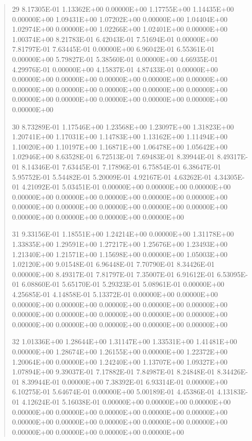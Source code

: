 \documentclass[letterpaper,10pt,english]{sphinxmanual}
\begin{document}
\begin{quote}
\begin{DUlineblock}{0em}
\item[] 29   8.17305E-01  1.13362E+00  0.00000E+00  1.17755E+00  1.14435E+00  0.00000E+00  1.09431E+00  1.07202E+00  0.00000E+00  1.04404E+00  1.02974E+00  0.00000E+00  1.02266E+00  1.02401E+00  0.00000E+00  1.00374E+00  8.21783E-01  6.42043E-01  7.51694E-01  0.00000E+00  7.81797E-01  7.63445E-01  0.00000E+00  6.96042E-01  6.55361E-01  0.00000E+00  5.79827E-01  5.38560E-01  0.00000E+00  4.66935E-01  4.29976E-01  0.00000E+00  4.15837E-01  4.87433E-01  0.00000E+00  0.00000E+00  0.00000E+00  0.00000E+00  0.00000E+00  0.00000E+00  0.00000E+00  0.00000E+00  0.00000E+00  0.00000E+00  0.00000E+00  0.00000E+00  0.00000E+00  0.00000E+00  0.00000E+00  0.00000E+00  0.00000E+00
\item[] 30   8.73289E-01  1.17546E+00  1.23568E+00  1.23097E+00  1.31823E+00  1.20741E+00  1.17031E+00  1.14783E+00  1.13162E+00  1.11494E+00  1.10020E+00  1.10197E+00  1.16871E+00  1.06478E+00  1.05642E+00  1.02946E+00  8.63528E-01  6.72513E-01  7.69483E-01  8.39944E-01  8.49317E-01  8.14346E-01  7.63445E-01  7.17896E-01  6.75854E-01  6.38647E-01  5.95752E-01  5.54482E-01  5.20009E-01  4.92167E-01  4.63262E-01  4.34305E-01  4.21092E-01  5.03451E-01  0.00000E+00  0.00000E+00  0.00000E+00  0.00000E+00  0.00000E+00  0.00000E+00  0.00000E+00  0.00000E+00  0.00000E+00  0.00000E+00  0.00000E+00  0.00000E+00  0.00000E+00  0.00000E+00  0.00000E+00  0.00000E+00  0.00000E+00
\item[] 31   9.33156E-01  1.18551E+00  1.24214E+00  0.00000E+00  1.31178E+00  1.33835E+00  1.29591E+00  1.27217E+00  1.25676E+00  1.23493E+00  1.21340E+00  1.21571E+00  1.15698E+00  0.00000E+00  1.05003E+00  1.02120E+00  9.01548E-01  6.96448E-01  7.70790E-01  8.34426E-01  0.00000E+00  8.49317E-01  7.81797E-01  7.35007E-01  6.91612E-01  6.53095E-01  6.08860E-01  5.65170E-01  5.29323E-01  5.08961E-01  0.00000E+00  4.25685E-01  4.14858E-01  5.13372E-01  0.00000E+00  0.00000E+00  0.00000E+00  0.00000E+00  0.00000E+00  0.00000E+00  0.00000E+00  0.00000E+00  0.00000E+00  0.00000E+00  0.00000E+00  0.00000E+00  0.00000E+00  0.00000E+00  0.00000E+00  0.00000E+00  0.00000E+00
\item[] 32   1.01336E+00  1.28644E+00  1.31147E+00  1.33531E+00  1.41481E+00  0.00000E+00  1.28674E+00  1.26155E+00  0.00000E+00  1.22372E+00  1.20064E+00  0.00000E+00  1.24240E+00  1.13707E+00  1.09327E+00  1.07894E+00  9.39037E-01  7.17882E-01  7.84987E-01  8.24848E-01  8.34426E-01  8.39944E-01  0.00000E+00  7.38392E-01  6.93314E-01  0.00000E+00  6.10275E-01  5.64674E-01  0.00000E+00  5.00189E-01  4.45386E-01  4.13183E-01  4.12624E-01  5.16038E-01  0.00000E+00  0.00000E+00  0.00000E+00  0.00000E+00  0.00000E+00  0.00000E+00  0.00000E+00  0.00000E+00  0.00000E+00  0.00000E+00  0.00000E+00  0.00000E+00  0.00000E+00  0.00000E+00  0.00000E+00  0.00000E+00  0.00000E+00

\end{DUlineblock}
\end{quote}
\end{document}
